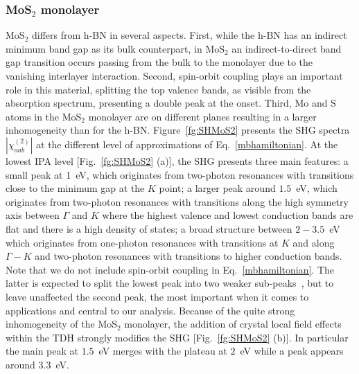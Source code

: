 \subsubsection{MoS$_2$ monolayer}
MoS$_2$ differs from h-BN in several aspects. First, while the h-BN has an indirect minimum band gap as its bulk counterpart, in MoS$_2$ an indirect-to-direct band gap transition occurs passing from the bulk to the monolayer due to the vanishing interlayer interaction.  Second, spin-orbit coupling plays an important role in this material, splitting the top valence bands, as visible from the absorption spectrum, presenting a double peak at the onset.\cite{PhysRevLett.105.136805} Third, Mo and S atoms in the MoS$_2$ monolayer are on different planes resulting in a larger inhomogeneity than for the h-BN.
Figure~\ref{fg:SHMoS2} presents the SHG spectra $|\chi^{(2)}_{aab}|$  at the different level of approximations of Eq.~\eqref{mbhamiltonian}. At the lowest IPA level [Fig.~\ref{fg:SHMoS2} (a)], the SHG presents three main features: a small peak at 1~eV, which originates from two-photon resonances with transitions close to the minimum gap at the $K$ point; a larger peak around $1.5$~eV, which originates from two-photon resonances with transitions along the high symmetry axis between $\Gamma$ and $K$ where the highest valence and lowest conduction bands are flat and there is a high density of states; a broad structure between $2-3.5$~eV which originates from one-photon resonances with transitions at $K$ and along $\Gamma-K$ and two-photon resonances with transitions to higher conduction bands. Note that we do not include spin-orbit coupling in Eq.~\eqref{mbhamiltonian}. 
The latter is expected to split the lowest peak into two weaker sub-peaks~\cite{molina2013effect}, but to leave unaffected the second peak, the most important when it comes to applications and central to our analysis.\cite{PhysRevB.87.201401}  
Because of the quite strong inhomogeneity of the MoS$_2$ monolayer, the addition of crystal local field effects within the TDH strongly modifies the SHG  [Fig.~\ref{fg:SHMoS2} (b)]. 
In particular the main peak at $1.5$~eV merges with the plateau at $2$~eV while a peak appears around $3.3$~eV.
